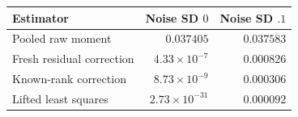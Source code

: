 \begin{tabular}{lrr}
\toprule
Estimator & Noise SD $0$ & Noise SD $.1$\\\midrule
Pooled raw moment & $0.037405$ & $0.037583$\\
Fresh residual correction & $4.33\times10^{-7}$ & $0.000826$\\
Known-rank correction & $8.73\times10^{-9}$ & $0.000306$\\
Lifted least squares & $2.73\times10^{-31}$ & $0.000092$\\
\bottomrule
\end{tabular}
